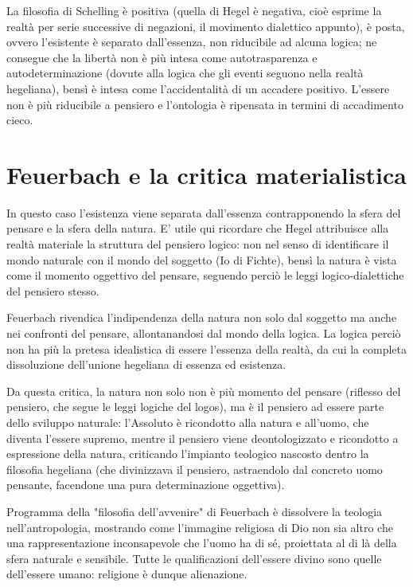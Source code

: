 La filosofia di Schelling è positiva (quella di Hegel è negativa, cioè esprime la realtà per serie successive di negazioni, il movimento dialettico appunto), è posta, ovvero l'esistente è separato dall'essenza, non riducibile ad alcuna logica; ne consegue che la libertà non è più intesa come autotrasparenza e autodeterminazione (dovute alla logica che gli eventi seguono nella realtà hegeliana), bensì è intesa come l'accidentalità di un accadere positivo. L'essere non è più riducibile a pensiero e l'ontologia è ripensata in termini di accadimento cieco.

\section{Feuerbach e la critica materialistica}

In questo caso l'esistenza viene separata dall'essenza contrapponendo la sfera del pensare e la sfera della natura. E' utile qui ricordare che Hegel attribuisce alla realtà materiale la struttura del pensiero logico: non nel senso di identificare il mondo naturale con il mondo del soggetto (Io di Fichte), bensì la natura è vista come il momento oggettivo del pensare, seguendo perciò le leggi logico-dialettiche del pensiero stesso.

Feuerbach rivendica l'indipendenza della natura non solo dal soggetto ma anche nei confronti del pensare, allontanandosi dal mondo della logica. La logica perciò non ha più la pretesa idealistica di essere l'essenza della realtà, da cui la completa dissoluzione dell'unione hegeliana  di essenza ed esistenza.

Da questa critica, la natura non solo non è più momento del pensare (riflesso del pensiero, che segue le leggi logiche del logos), ma è il pensiero ad essere parte dello sviluppo naturale: l'Assoluto è ricondotto alla natura e all'uomo, che diventa l'essere supremo, mentre il pensiero viene deontologizzato  e ricondotto a espressione della natura, criticando l'impianto teologico nascosto dentro la filosofia hegeliana (che divinizzava il pensiero, astraendolo dal concreto uomo pensante, facendone una pura determinazione oggettiva).

Programma della "filosofia dell'avvenire" di Feuerbach  è dissolvere la teologia nell'antropologia, mostrando come l'immagine religiosa di Dio non sia altro che una rappresentazione inconsapevole che l'uomo ha di sé, proiettata al di là della sfera naturale e sensibile. Tutte le qualificazioni dell'essere divino sono quelle dell'essere umano: religione è dunque alienazione.

